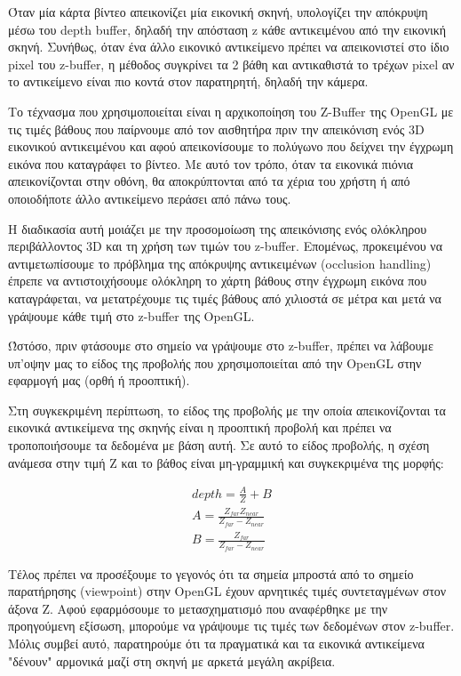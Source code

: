 Όταν μία κάρτα βίντεο απεικονίζει μία εικονική σκηνή, υπολογίζει την απόκρυψη μέσω του depth buffer, δηλαδή την απόσταση z κάθε αντικειμένου από την εικονική σκηνή. Συνήθως, όταν ένα άλλο εικονικό αντικείμενο πρέπει να απεικονιστεί στο ίδιο pixel του z-buffer, η μέθοδος συγκρίνει τα 2 βάθη και αντικαθιστά το τρέχων pixel αν το αντικείμενο είναι πιο κοντά στον παρατηρητή, δηλαδή την κάμερα.

Το τέχνασμα που χρησιμοποιείται είναι η αρχικοποίηση του Z-Buffer της OpenGL με τις τιμές βάθους που παίρνουμε από τον αισθητήρα πριν την απεικόνιση ενός 3D εικονικού αντικειμένου και αφού απεικονίσουμε το πολύγωνο που δείχνει την έγχρωμη εικόνα που καταγράφει το βίντεο. Με αυτό τον τρόπο, όταν τα εικονικά πιόνια απεικονίζονται στην οθόνη, θα αποκρύπτονται από τα χέρια του χρήστη ή από οποιοδήποτε άλλο αντικείμενο περάσει από πάνω τους. 

Η διαδικασία αυτή μοιάζει με την προσομοίωση της απεικόνισης ενός ολόκληρου περιβάλλοντος 3D και τη χρήση των τιμών του z-buffer. Eπομένως, προκειμένου να αντιμετωπίσουμε το πρόβλημα της απόκρυψης αντικειμένων (occlusion handling) έπρεπε να αντιστοιχήσουμε ολόκληρη το χάρτη βάθους στην έγχρωμη εικόνα που καταγράφεται, να μετατρέχουμε τις τιμές βάθους από χιλιοστά σε μέτρα και μετά να γράψουμε κάθε τιμή στο z-buffer της OpenGL.


Ώστόσο, πριν φτάσουμε στο σημείο να γράψουμε στο z-buffer, πρέπει να λάβουμε υπ'οψην μας το είδος της προβολής που χρησιμοποιείται από την OpenGL στην εφαρμογή μας (ορθή ή προοπτική). 


Στη συγκεκριμένη περίπτωση, το είδος της προβολής με την οποία απεικονίζονται τα εικονικά αντικείμενα της σκηνής είναι η προοπτική προβολή και πρέπει να τροποποιήσουμε τα δεδομένα με βάση αυτή. Σε αυτό το είδος προβολής, η σχέση ανάμεσα στην τιμή Z και το βάθος είναι μη-γραμμική και συγκεκριμένα της μορφής:



\begin{equation}
\begin{aligned}
depth=\frac{A}{Z}+B \\
A=\frac{Z_{far}Z_{near}}{Z_{far}-Z_{near}}\\ B=\frac{Z_{far}}{Z_{far}-Z_{near}}
\end{aligned}
\end{equation}

Τέλος πρέπει να προσέξουμε το γεγονός ότι τα σημεία μπροστά από το σημείο παρατήρησης (viewpoint) στην OpenGL έχουν αρνητικές τιμές συντεταγμένων στον άξονα Z. Αφού εφαρμόσουμε το μετασχηματισμό που αναφέρθηκε με την προηγούμενη εξίσωση, μπορούμε να γράψουμε τις τιμές των δεδομένων στον z-buffer. Μόλις συμβεί αυτό, παρατηρούμε ότι τα πραγματικά και τα εικονικά αντικείμενα "δένουν" αρμονικά μαζί στη σκηνή με αρκετά μεγάλη ακρίβεια. 




